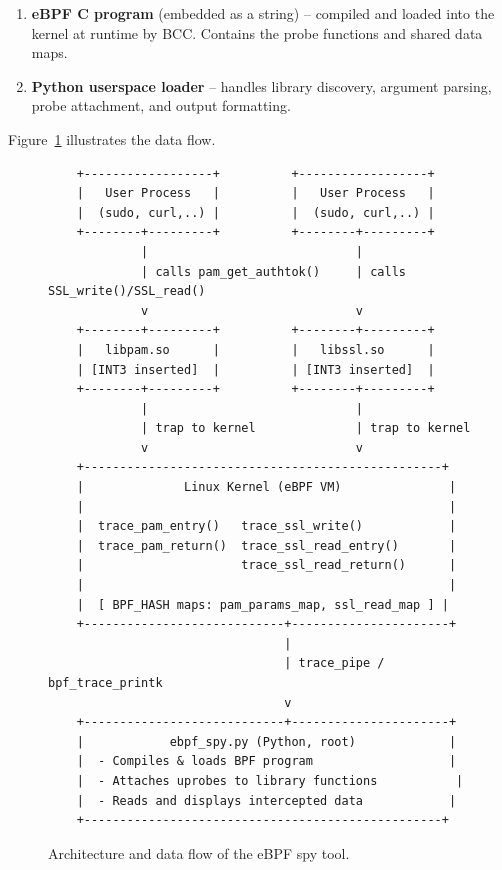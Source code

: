 \documentclass[11pt,a4paper]{article}
\begin{document}
\begin{enumerate}
    \item \textbf{eBPF C program} (embedded as a string) -- compiled and loaded
          into the kernel at runtime by BCC. Contains the probe functions and
          shared data maps.
    \item \textbf{Python userspace loader} -- handles library discovery,
          argument parsing, probe attachment, and output formatting.
\end{enumerate}

Figure~\ref{fig:architecture} illustrates the data flow.

\begin{figure}[H]
\centering
\small
\begin{verbatim}
    +------------------+          +------------------+
    |   User Process   |          |   User Process   |
    |  (sudo, curl,..) |          |  (sudo, curl,..) |
    +--------+---------+          +--------+---------+
             |                             |
             | calls pam_get_authtok()     | calls SSL_write()/SSL_read()
             v                             v
    +--------+---------+          +--------+---------+
    |   libpam.so      |          |   libssl.so      |
    | [INT3 inserted]  |          | [INT3 inserted]  |
    +--------+---------+          +--------+---------+
             |                             |
             | trap to kernel              | trap to kernel
             v                             v
    +--------------------------------------------------+
    |              Linux Kernel (eBPF VM)               |
    |                                                   |
    |  trace_pam_entry()   trace_ssl_write()            |
    |  trace_pam_return()  trace_ssl_read_entry()       |
    |                      trace_ssl_read_return()      |
    |                                                   |
    |  [ BPF_HASH maps: pam_params_map, ssl_read_map ] |
    +----------------------------+----------------------+
                                 |
                                 | trace_pipe / bpf_trace_printk
                                 v
    +----------------------------+----------------------+
    |            ebpf_spy.py (Python, root)             |
    |  - Compiles & loads BPF program                   |
    |  - Attaches uprobes to library functions           |
    |  - Reads and displays intercepted data            |
    +--------------------------------------------------+
\end{verbatim}
\caption{Architecture and data flow of the eBPF spy tool.}
\label{fig:architecture}
\end{figure}
\end{document}

